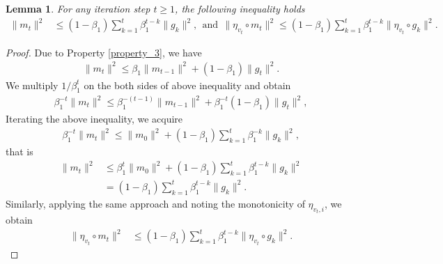 \documentclass{article} %
\newtheorem{lemma}{Lemma}[section]
\begin{document}
\begin{lemma}\label{property_3.5}
For any iteration step \( t\ge 1 \), the following inequality holds
\begin{align*}
 \|m_{t}\|^{2}&\le(1-\beta_{1})\sum_{k=1}^{t}\beta_{1}^{t-k}\|g_{k}\|^{2},\ \ \text{and}\ \ \|\eta_{v_{t}}\circ m_{t}\|^{2}\le (1-\beta_{1})\sum_{k=1}^{t}\beta_{1}^{t-k}\|\eta_{v_{t}}\circ g_{k}\|^{2}.
\end{align*}
\end{lemma}
\begin{proof}
Due to Property \ref{property_3}, we have
\begin{align*}
\| m_{t}\|^{2}\le\beta_{1}\| m_{t-1}\|^{2}+(1-\beta_{1})\|g_{t}\|^{2}.
\end{align*} 
We multiply $1/\beta_{1}^{t}$ on the both sides of above inequality and obtain
\begin{align*}
\beta_{1}^{-t}\| m_{t}\|^{2}\le\beta_{1}^{-(t-1)}\| m_{t-1}\|^{2}+\beta_{1}^{-t}(1-\beta_{1})\|g_{t}\|^{2} ,  
\end{align*}
Iterating the above inequality, we acquire
\begin{align*}
\beta_{1}^{-t}\| m_{t}\|^{2}\le\| m_{0}\|^{2}+(1-\beta_{1})\sum_{k=1}^{t}\beta_{1}^{-k}\|g_{k}\|^{2},
\end{align*}
that is
\begin{align*}
\|m_{t}\|^{2}&\le \beta_{1}^{t}   \| m_{0}\|^{2}+(1-\beta_{1})\sum_{k=1}^{t}\beta_{1}^{t-k}\|g_{k}\|^{2}\\&=(1-\beta_{1})\sum_{k=1}^{t}\beta_{1}^{t-k}\|g_{k}\|^{2}.
\end{align*}
Similarly, applying the same approach and noting the monotonicity of \(\eta_{v_{t},i}\), we obtain
\begin{align*}
\|\eta_{v_{t}}\circ m_{t}\|^{2}&\le (1-\beta_{1})\sum_{k=1}^{t}\beta_{1}^{t-k}\|\eta_{v_{t}}\circ g_{k}\|^{2}. \tag*{\qedhere}
\end{align*}
\end{proof}
\end{document}
